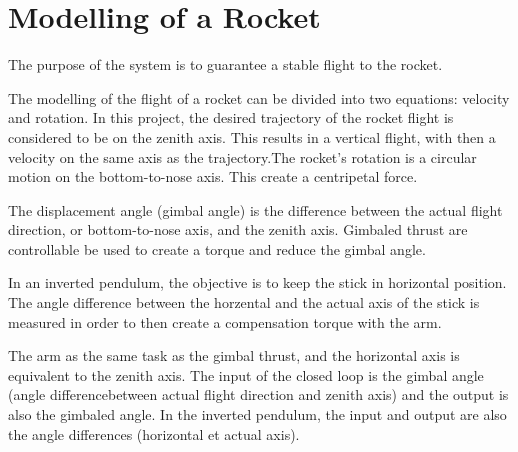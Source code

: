 \section{Modelling of a Rocket}
The purpose of the system is to guarantee a stable flight to the rocket.

The modelling of the flight of a rocket can be divided into two equations: velocity and rotation. In this project, the desired trajectory of the rocket flight is considered to be on the zenith axis. This results in a vertical flight, with then a velocity on the same axis as the trajectory.The rocket's rotation is a circular motion on the bottom-to-nose axis. This create a centripetal force.

The displacement angle (gimbal angle) is the difference between the actual flight direction, or bottom-to-nose axis, and the zenith axis. Gimbaled thrust are controllable be used to create a torque and reduce the gimbal angle. 

In an inverted pendulum, the objective is to keep the stick in horizontal position. The angle difference between the horzental and the actual axis of the stick is measured in order to then create a compensation torque with the arm.

The arm as the same task as the gimbal thrust, and the horizontal axis is equivalent to the zenith axis.
The input of the closed loop is the gimbal angle (angle differencebetween actual flight direction and zenith axis) and the output is also the gimbaled angle. In the inverted pendulum, the input and output are also the angle differences (horizontal et actual axis). 